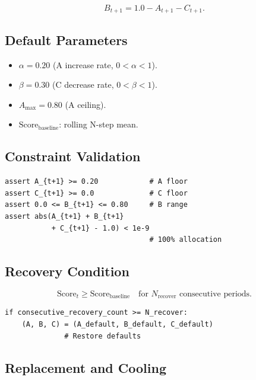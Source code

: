 \begin{equation}
B_{t+1} = 1.0 - A_{t+1} - C_{t+1}.
\label{eq:r1fix-Bt-update}
\end{equation}

\subsection{Default Parameters}

\begin{itemize}
\item $\alpha = 0.20$ (A increase rate, $0 < \alpha < 1$).
\item $\beta = 0.30$ (C decrease rate, $0 < \beta < 1$).
\item $A_{\max} = 0.80$ (A ceiling).
\item $\mathrm{Score}_{\mathrm{baseline}}$: rolling N-step mean.
\end{itemize}

\subsection{Constraint Validation}

\begin{lstlisting}[basicstyle=\ttfamily\small,frame=single]
assert A_{t+1} >= 0.20            # A floor
assert C_{t+1} >= 0.0             # C floor
assert 0.0 <= B_{t+1} <= 0.80     # B range
assert abs(A_{t+1} + B_{t+1}
           + C_{t+1} - 1.0) < 1e-9
                                  # 100% allocation
\end{lstlisting}

\subsection{Recovery Condition}

\begin{equation}
\mathrm{Score}_t \ge \mathrm{Score}_{\mathrm{baseline}}
\quad \text{for } N_{\mathrm{recover}} \text{ consecutive periods}.
\end{equation}

\begin{lstlisting}[basicstyle=\ttfamily\small,frame=single]
if consecutive_recovery_count >= N_recover:
    (A, B, C) = (A_default, B_default, C_default)
              # Restore defaults
\end{lstlisting}

\subsection{Replacement and Cooling}

